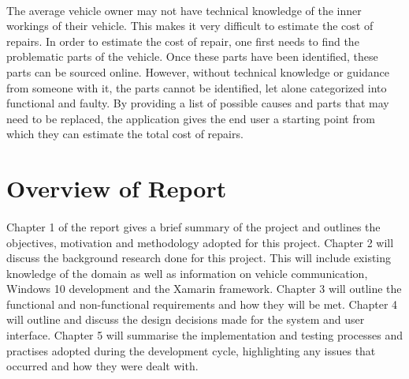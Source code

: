 	\paragraph{}{
	The average vehicle owner may not have technical knowledge of the inner workings of their vehicle. This makes it very difficult to estimate the cost of repairs. In order to estimate the cost of repair, one first needs to find the problematic parts of the vehicle. Once these parts have been identified, these parts can be sourced online. However, without technical knowledge or guidance from someone with it, the parts cannot be identified, let alone categorized into functional and faulty. By providing a list of possible causes and parts that may need to be replaced, the application gives the end user a starting point from which they can estimate the total cost of repairs. 
	}

\section{Overview of Report}
	\paragraph{}{
	Chapter 1 of the report gives a brief summary of the project and outlines the objectives, motivation and methodology adopted for this project. Chapter 2 will discuss the background research done for this project. This will include existing knowledge of the domain as well as information on vehicle communication, Windows 10 development and the Xamarin framework. Chapter 3 will outline the functional and non-functional requirements and how they will be met. Chapter 4 will outline and discuss the design decisions made for the system and user interface. Chapter 5 will summarise the implementation and testing processes and practises adopted during the development cycle, highlighting any issues that occurred and how they were dealt with.
	}	
